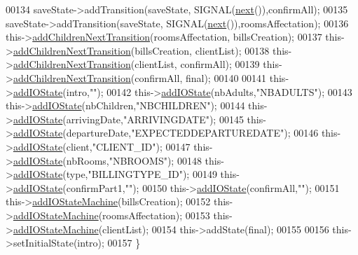 \begin{DoxyCode}
00134     saveState->addTransition(saveState, SIGNAL(\hyperlink{classSH__InOutStateMachine_aa9ee51efe0e17dcf5366c8a97b523892}{next}()),confirmAll);
00135     saveState->addTransition(saveState, SIGNAL(\hyperlink{classSH__InOutStateMachine_aa9ee51efe0e17dcf5366c8a97b523892}{next}()),roomsAffectation);
00136     this->\hyperlink{classSH__InOutStateMachine_a689e5513ef6ef3fc1598efacd413372e}{addChildrenNextTransition}(roomsAffectation, billsCreation);
00137     this->\hyperlink{classSH__InOutStateMachine_a689e5513ef6ef3fc1598efacd413372e}{addChildrenNextTransition}(billsCreation, clientList);
00138     this->\hyperlink{classSH__InOutStateMachine_a689e5513ef6ef3fc1598efacd413372e}{addChildrenNextTransition}(clientList, confirmAll);
00139     this->\hyperlink{classSH__InOutStateMachine_a689e5513ef6ef3fc1598efacd413372e}{addChildrenNextTransition}(confirmAll, \textcolor{keyword}{final});
00140 
00141     this->\hyperlink{classSH__InOutStateMachine_ad6b778d052f741daee720c047059ce0e}{addIOState}(intro,\textcolor{stringliteral}{""});
00142     this->\hyperlink{classSH__InOutStateMachine_ad6b778d052f741daee720c047059ce0e}{addIOState}(nbAdults,\textcolor{stringliteral}{"NBADULTS"});
00143     this->\hyperlink{classSH__InOutStateMachine_ad6b778d052f741daee720c047059ce0e}{addIOState}(nbChildren,\textcolor{stringliteral}{"NBCHILDREN"});
00144     this->\hyperlink{classSH__InOutStateMachine_ad6b778d052f741daee720c047059ce0e}{addIOState}(arrivingDate,\textcolor{stringliteral}{"ARRIVINGDATE"});
00145     this->\hyperlink{classSH__InOutStateMachine_ad6b778d052f741daee720c047059ce0e}{addIOState}(departureDate,\textcolor{stringliteral}{"EXPECTEDDEPARTUREDATE"});
00146     this->\hyperlink{classSH__InOutStateMachine_ad6b778d052f741daee720c047059ce0e}{addIOState}(client,\textcolor{stringliteral}{"CLIENT\_ID"});
00147     this->\hyperlink{classSH__InOutStateMachine_ad6b778d052f741daee720c047059ce0e}{addIOState}(nbRooms,\textcolor{stringliteral}{"NBROOMS"});
00148     this->\hyperlink{classSH__InOutStateMachine_ad6b778d052f741daee720c047059ce0e}{addIOState}(type,\textcolor{stringliteral}{"BILLINGTYPE\_ID"});
00149     this->\hyperlink{classSH__InOutStateMachine_ad6b778d052f741daee720c047059ce0e}{addIOState}(confirmPart1,\textcolor{stringliteral}{""});
00150     this->\hyperlink{classSH__InOutStateMachine_ad6b778d052f741daee720c047059ce0e}{addIOState}(confirmAll,\textcolor{stringliteral}{""});
00151     this->\hyperlink{classSH__InOutStateMachine_a56954869252c7f1980abf37df9919b5e}{addIOStateMachine}(billsCreation);
00152     this->\hyperlink{classSH__InOutStateMachine_a56954869252c7f1980abf37df9919b5e}{addIOStateMachine}(roomsAffectation);
00153     this->\hyperlink{classSH__InOutStateMachine_a56954869252c7f1980abf37df9919b5e}{addIOStateMachine}(clientList);
00154     this->addState(\textcolor{keyword}{final});
00155 
00156     this->setInitialState(intro);
00157 \}
\end{DoxyCode}


